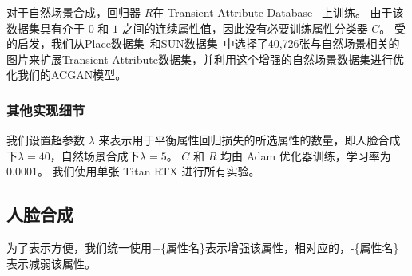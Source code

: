 对于自然场景合成，回归器 $R$在 Transient Attribute Database~\cite{scenedataset} 上训练。 由于该数据集具有介于 $0$ 和 $1$ 之间的连续属性值，因此没有必要训练属性分类器 $C$。 受\cite{iclr2021}的启发，我们从Place数据集~\cite{place}和SUN数据集~\cite{sun}中选择了40,726张与自然场景相关的图片来扩展Transient Attribute数据集，并利用这个增强的自然场景数据集进行优化我们的ACGAN模型。


\subsubsection{其他实现细节}
我们设置超参数 $\lambda$ 来表示用于平衡属性回归损失的所选属性的数量，即人脸合成下$\lambda=40$，自然场景合成下$\lambda=5$。 $C$ 和 $R$ 均由 Adam 优化器训练，学习率为 0.0001。 我们使用单张 Titan RTX 进行所有实验。

\subsection{人脸合成}
为了表示方便，我们统一使用+\{属性名\}表示增强该属性，相对应的，-\{属性名\}表示减弱该属性。

